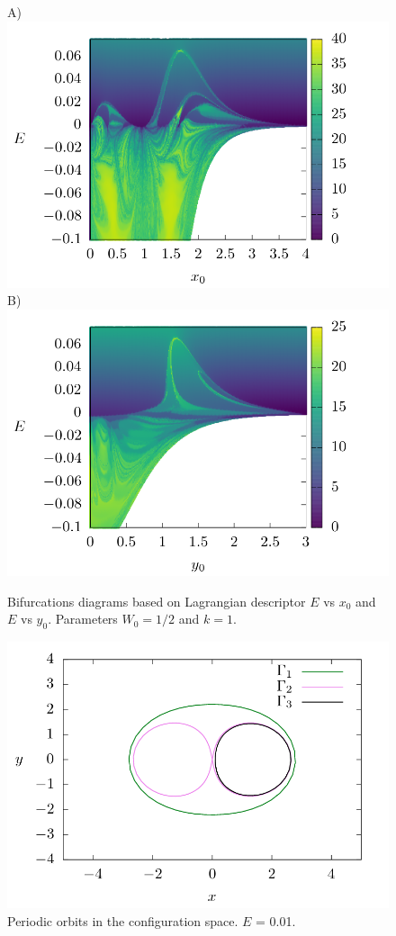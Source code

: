 \documentclass[10pt,aps,onecolumn,superscriptaddress]{revtex4-2}
\begin{document}
\begin{figure}[htbp]
	A)\includegraphics[scale=0.35]{ld_t60_line_x_E.png}
	B)\includegraphics[scale=0.35]{ld_t60_line_y_E.png}
	\caption{ Bifurcations diagrams based on Lagrangian descriptor $E$ vs $x_0$ and $E$ vs $y_0$.  Parameters $W_0 = 1/2$ and $k = 1$. }
	\label{fig:ld_E_xy}
\end{figure}

\begin{figure}[htbp]
	\includegraphics[scale=0.5]{orbits_2D.png}
	\caption{Periodic orbits in the configuration space. $E$ = 0.01. }
	\label{fig:ld_E_xy}
\end{figure}
\end{document}
